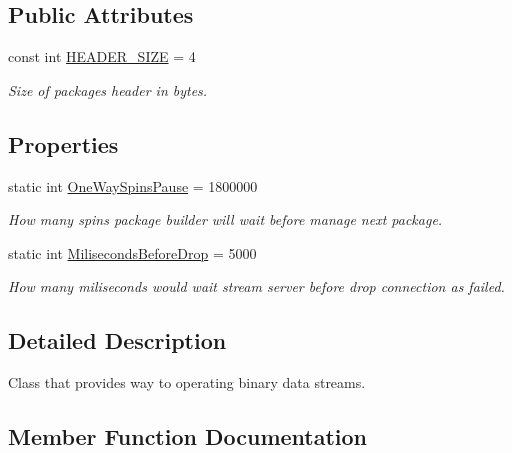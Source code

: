 \subsection*{Public Attributes}
\begin{DoxyCompactItemize}
\item 
const int \mbox{\hyperlink{class_uniform_data_operator_1_1_binary_1_1_i_o_1_1_stream_handler_a74670b4bc43b03cbfcb5f222fe731da0}{H\+E\+A\+D\+E\+R\+\_\+\+S\+I\+ZE}} = 4
\begin{DoxyCompactList}\small\item\em Size of package\textquotesingle{}s header in bytes. \end{DoxyCompactList}\end{DoxyCompactItemize}
\subsection*{Properties}
\begin{DoxyCompactItemize}
\item 
static int \mbox{\hyperlink{class_uniform_data_operator_1_1_binary_1_1_i_o_1_1_stream_handler_a1b6540f8d3bf3c455caabc0f007f6702}{One\+Way\+Spins\+Pause}} = 1800000
\begin{DoxyCompactList}\small\item\em How many spins package builder will wait before manage next package. \end{DoxyCompactList}\item 
static int \mbox{\hyperlink{class_uniform_data_operator_1_1_binary_1_1_i_o_1_1_stream_handler_a9f8d84e7fcc7106e4dfed14d7f574b87}{Miliseconds\+Before\+Drop}} = 5000
\begin{DoxyCompactList}\small\item\em How many miliseconds would wait stream server before drop connection as failed. \end{DoxyCompactList}\end{DoxyCompactItemize}


\subsection{Detailed Description}
Class that provides way to operating binary data streams. 



\subsection{Member Function Documentation}
\mbox{\label{class_uniform_data_operator_1_1_binary_1_1_i_o_1_1_stream_handler_ac3b951b7af74e35d8c01f9986d59abbf}} 
